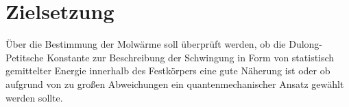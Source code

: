 \section{Zielsetzung}
\label{sec:Zielsetzung}
Über die Bestimmung der Molwärme soll überprüft werden, ob die
Dulong-Petitsche Konstante zur Beschreibung der Schwingung in Form von
statistisch gemittelter Energie innerhalb des Festkörpers eine gute
Näherung ist oder ob aufgrund von zu großen Abweichungen
ein quantenmechanischer Ansatz gewählt werden sollte.
